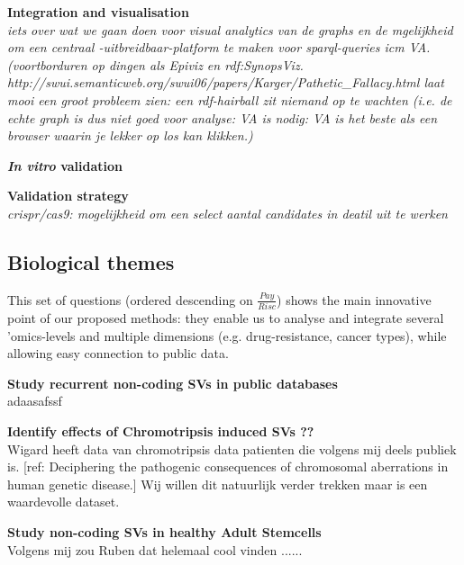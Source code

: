 \documentclass[twoside,fontsize=12pt]{article}
\begin{document}
\medskip

\noindent
\textbf{Integration and visualisation} \\
\emph{ \color{red}iets over wat we gaan doen voor visual analytics van de graphs en de mgelijkheid om een centraal -uitbreidbaar-platform te maken voor sparql-queries icm VA. (voortborduren op dingen als Epiviz en rdf:SynopsViz.  http://swui.semanticweb.org/swui06/papers/Karger/Pathetic\_Fallacy.html laat mooi een groot probleem zien: een rdf-hairball zit niemand op te wachten (i.e. de echte graph is dus niet goed voor analyse: VA is nodig: VA is het beste als een browser waarin je lekker op los kan klikken.)}



\medskip

\noindent
\textbf{\textit{In vitro} validation} \\

\medskip

\noindent
\textbf{Validation strategy} \\
\emph{ \color{red}crispr/cas9: mogelijkheid om een select aantal candidates in deatil uit te werken}


\subsection*{Biological themes}
This set of questions (ordered descending on $\frac{Pay}{Risc}$) shows the main innovative point of our proposed methods: they enable us to analyse and integrate several 'omics-levels and multiple dimensions (e.g. drug-resistance, cancer types), while allowing easy connection to public data. 
\medskip

\noindent
\textbf{Study recurrent non-coding SVs in public databases} \\
adaasafssf
\medskip

\noindent
\textbf{Identify effects of Chromotripsis induced SVs ??} \\
Wigard heeft data van chromotripsis data patienten die volgens mij deels publiek is.
[ref: Deciphering the pathogenic consequences of chromosomal aberrations in human genetic disease.]
Wij willen dit natuurlijk verder trekken maar is een waardevolle dataset.
\medskip

\noindent
\textbf{Study non-coding SVs in healthy Adult Stemcells} \\
Volgens mij zou Ruben dat helemaal cool vinden ......
\medskip
\end{document}
